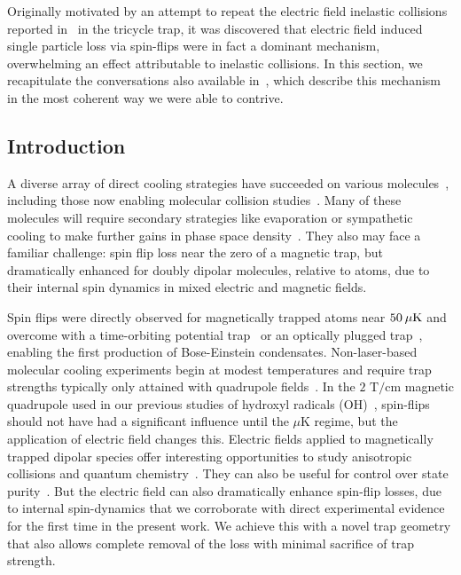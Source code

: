 \documentclass[defaultstyle,11pt]{thesis}
\begin{document}
Originally motivated by an attempt to repeat the electric field inelastic collisions reported in~\cite{Stuhl2013} in the tricycle trap, it was discovered that electric field induced single particle loss via spin-flips were in fact a dominant mechanism, overwhelming an effect attributable to inelastic collisions.
In this section, we recapitulate the conversations also available in~\cite{Reens2017}, which describe this mechanism in the most coherent way we were able to contrive.

\subsection{Introduction}

A diverse array of direct cooling strategies have succeeded on various molecules~\cite{Weinstein1998, Bethlem1999, Bochinski2003, Narevicius2008, Wiederkehr2012, Marx2015, Prehn2016, Liu2017a}, including those now enabling molecular collision studies~\cite{Sawyer2011, Zastrow2014, Klein2016, Wu2017}.
Many of these molecules will require secondary strategies like evaporation or sympathetic cooling to make further gains in phase space density~\cite{Parazzoli2011, Stuhl2012evap, Quemener2016}.
They also may face a familiar challenge: spin flip loss near the zero of a magnetic trap, but dramatically enhanced for doubly dipolar molecules, relative to atoms, due to their internal spin dynamics in mixed electric and magnetic fields.

Spin flips were directly observed for magnetically trapped atoms near $50{\nobreak\hspace{.2em}}\mu\text{K}$ and overcome with a time-orbiting potential trap~\cite{Petrich1995} or an optically plugged trap~\cite{Davis1995}, enabling the first production of Bose-Einstein condensates.
Non-laser-based molecular cooling experiments begin at modest temperatures and require trap strengths typically only attained with quadrupole fields~\cite{Weinstein1998, Sawyer2008, Riedel2011, Quintero-Perez2014, Akerman2017}.
In the $2\text{ T/cm}$ magnetic quadrupole used in our previous studies of hydroxyl radicals (OH)~\cite{Stuhl2012evap}, spin-flips should not have had a significant influence until the $\mu$K regime, but the application of electric field changes this.
Electric fields applied to magnetically trapped dipolar species offer interesting opportunities to study anisotropic collisions and quantum chemistry~\cite{Stuhl2013}.
They can also be useful for control over state purity~\cite{Stuhl2012uwave}.
But the electric field can also dramatically enhance spin-flip losses, due to internal spin-dynamics that we corroborate with direct experimental evidence for the first time in the present work.
We achieve this with a novel trap geometry that also allows complete removal of the loss with minimal sacrifice of trap strength.
\end{document}
